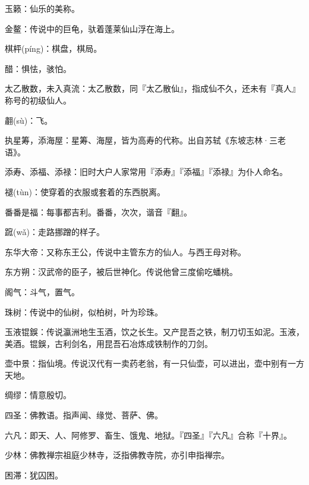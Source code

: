\startbuffer[983]
玉籁：仙乐的美称。
\stopbuffer


\startbuffer[984]
金鳌：传说中的巨龟，驮着蓬莱仙山浮在海上。
\stopbuffer


\startbuffer[985]
棋枰(píng)：棋盘，棋局。
\stopbuffer


\startbuffer[986]
醋：惧怯，骇怕。
\stopbuffer


\startbuffer[987]
太乙散数，未入真流：太乙散数，同『太乙散仙』，指成仙不久，还未有『真人』称号的初级仙人。
\stopbuffer


\startbuffer[988]
䎘(sù)：飞。
\stopbuffer


\startbuffer[989]
执星筹，添海屋：星筹、海屋，皆为高寿的代称。出自苏轼《东坡志林·三老语》。
\stopbuffer


\startbuffer[990]
添寿、添福、添禄：旧时大户人家常用『添寿』『添福』『添禄』为仆人命名。
\stopbuffer


\startbuffer[991]
褪(tùn)：使穿着的衣服或套着的东西脱离。
\stopbuffer


\startbuffer[992]
番番是福：每事都吉利。番番，次次，谐音『翻』。
\stopbuffer


\startbuffer[993]
䠚(wǎ)：走路挪蹭的样子。
\stopbuffer


\startbuffer[994]
东华大帝：又称东王公，传说中主管东方的仙人。与西王母对称。
\stopbuffer


\startbuffer[995]
东方朔：汉武帝的臣子，被后世神化。传说他曾三度偷吃蟠桃。
\stopbuffer


\startbuffer[996]
阁气：斗气，置气。
\stopbuffer


\startbuffer[997]
珠树：传说中的仙树，似柏树，叶为珍珠。
\stopbuffer


\startbuffer[998]
玉液锟鋘：传说瀛洲地生玉酒，饮之长生。又产昆吾之铁，制刀切玉如泥。玉液，美酒。锟鋘，古利剑名，用昆吾石冶炼成铁制作的刀剑。
\stopbuffer


\startbuffer[999]
壶中景：指仙境。传说汉代有一卖药老翁，有一只仙壶，可以进出，壶中别有一方天地。
\stopbuffer


\startbuffer[1000]
绸缪：情意殷切。
\stopbuffer


\startbuffer[1001]
四圣：佛教语。指声闻、缘觉、菩萨、佛。
\stopbuffer


\startbuffer[1002]
六凡：即天、人、阿修罗、畜生、饿鬼、地狱。『四圣』『六凡』合称『十界』。
\stopbuffer


\startbuffer[1003]
少林：佛教禅宗祖庭少林寺，泛指佛教寺院，亦引申指禅宗。
\stopbuffer


\startbuffer[1004]
困滞：犹囚困。
\stopbuffer


